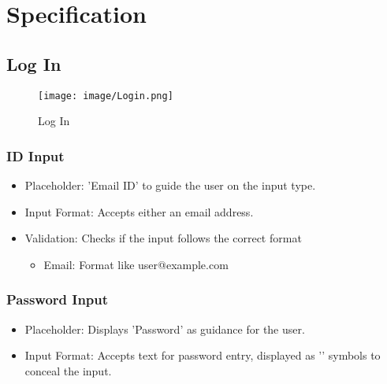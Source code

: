 \documentclass[conference]{IEEEtran}
\begin{document}
\section{Specification}

\subsection{Log In}

\begin{figure}[h!]
    \centering
    \texttt{[image: image/Login.png]}
    \caption{Log In}
    \label{fig:enter-label}
\end{figure}

\subsubsection{ID Input}
\begin{itemize}
    \item Placeholder: 'Email ID' to guide the user on the input type.\\
    \item Input Format: Accepts either an email address.\\
    \item Validation: Checks if the input follows the correct format
\begin{itemize}
    \item Email: Format like user@example.com\\
\end{itemize}
\end{itemize}

\subsubsection{Password Input}
\begin{itemize}
    \item Placeholder: Displays 'Password' as guidance for the user.\\
    \item Input Format: Accepts text for password entry, displayed as '\textbullet' symbols to conceal the input.\\
\end{itemize}
\end{document}
